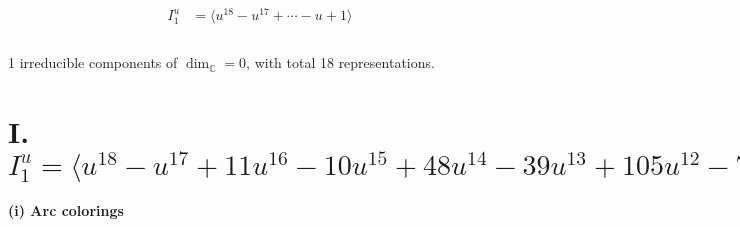 \documentclass[1p]{elsarticle_modified}
\theoremstyle{definition}
\begin{document}
\begin{align*}
I^u_{1}&=\langle 
u^{18}- u^{17}+\cdots- u+1\rangle \\
\\
\end{align*}
\raggedright * 1 irreducible components of $\dim_{\mathbb{C}}=0$, with total 18 representations.\\
\newpage
\renewcommand{\arraystretch}{1}
\centering \section*{I. $I^u_{1}= \langle u^{18}- u^{17}+11 u^{16}-10 u^{15}+48 u^{14}-39 u^{13}+105 u^{12}-74 u^{11}+121 u^{10}-71 u^9+75 u^8-38 u^7+30 u^6-18 u^5+8 u^4-4 u^3+u^2- u+1 \rangle$}
\flushleft \textbf{(i) Arc colorings}\\
\end{document}
